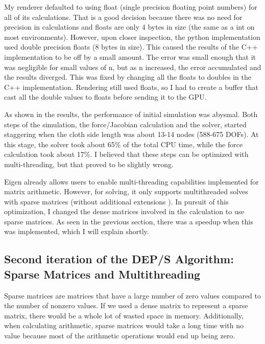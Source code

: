 \documentclass[letterpaper, 10 pt, conference]{ieeeconf}  %
\begin{document}
My renderer defaulted to using float (single precision floating point numbers) for all of its calculations. That is a good decision because there was no need for precision in calculations and floats are only 4 bytes in size (the same as a int on most environments). However, upon closer inspection, the python implementation used double precision floats (8 bytes in size). This caused the results of the C++ implementation to be off by a small amount. The error was small enough that it was negligible for small values of n, but as n increased, the error accumulated and the results diverged. This was fixed by changing all the floats to doubles in the C++ implementation. Rendering still used floats, so I had to create a buffer that cast all the double values to floats before sending it to the GPU.

As shown in the results, the performance of initial simulation was abysmal. Both steps of the simulation, the force/Jacobian calculation and the solver, started staggering when the cloth side length was about 13-14 nodes (588-675 DOFs). At this stage, the solver took about 65\% of the total CPU time, while the force calculation took about 17\%. I believed that these steps can be optimized with multi-threading, but that proved to be slightly wrong. 

Eigen already allows users to enable multi-threading capabilities implemented for matrix arithmetic. However, for solving, it only supports multithreaded solves with sparse matrices (without additional extensions \cite{eigen_library}). In pursuit of this optimization, I changed the dense matrices involved in the calculation to use sparse matrices. As seen in the previous section, there was a speedup when this was implemented, which I will explain shortly. 

\subsection{Second iteration of the DEP/S Algorithm: Sparse Matrices and Multithreading}
Sparse matrices are matrices that have a large number of zero values compared to the number of nonzero values. If we used a dense matrix to represent a sparse matrix, there would be a whole lot of wasted space in memory. Additionally, when calculating arithmetic, sparse matrices would take a long time with no value because most of the arithmetic operations would end up being zero. 
\end{document}
